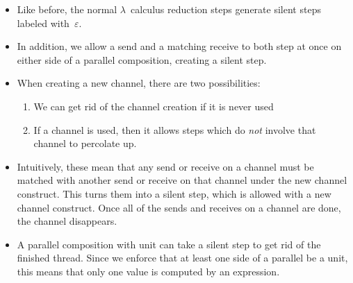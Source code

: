 \documentclass{lecturenotes}
\newcommand{\tabs}[3]{\ensuremath{\lambda #1 \colon #2.\,#3}}
\newcommand{\app}[2]{\ensuremath{#1\;#2}}
\newcommand{\unit}{\ensuremath{\textsf{(}\mkern0.5mu\textsf{)}}}
\newcommand{\FV}{\text{FV}}
\newcommand{\newchan}[2]{\ensuremath{\nu #1.\,#2}}
\newcommand{\send}[3]{\ensuremath{#1\langle#2\rangle.\,#3}}
\newcommand{\recv}[3]{\ensuremath{#1(#2).\,#3}}
\newcommand{\senda}[2]{\ensuremath{#1\langle#2\rangle}}
\newcommand{\recva}[2]{\ensuremath{#1(#2)}}
\begin{document}

\begin{itemize}
\item Like before, the normal $\lambda$~calculus reduction steps generate silent steps labeled with~$\varepsilon$.
\item In addition, we allow a send and a matching receive to both step at once on either side of a parallel composition, creating a silent step.
\item When creating a new channel, there are two possibilities:
  \begin{enumerate}[(1)]
  \item We can get rid of the channel creation if it is never used
  \item If a channel is used, then it allows steps which do \emph{not} involve that channel to percolate up.
  \end{enumerate}
\item Intuitively, these mean that any send or receive on a channel must be matched with another send or receive on that channel under the new channel construct.
  This turns them into a silent step, which is allowed with a new channel construct.
  Once all of the sends and receives on a channel are done, the channel disappears.
\item A parallel composition with unit can take a silent step to get rid of the finished thread.
  Since we enforce that at least one side of a parallel be a unit, this means that only one value is computed by an expression.
\end{itemize}
\end{document}
